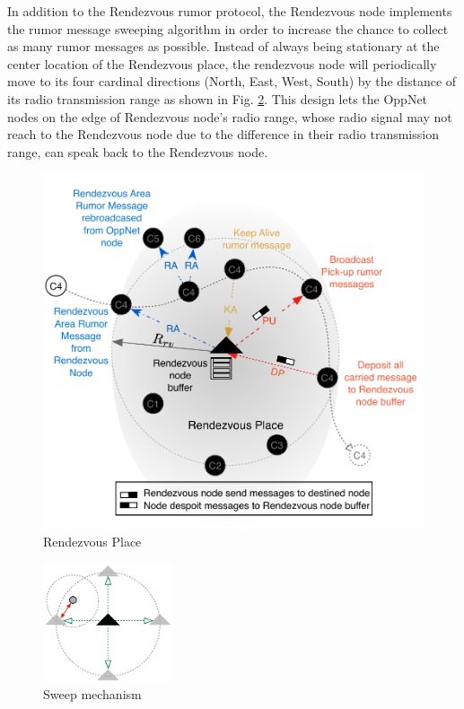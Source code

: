 In addition to the Rendezvous rumor protocol, the Rendezvous node implements the rumor message sweeping algorithm in order to increase the chance to collect as many rumor messages as possible.
%
Instead of always being stationary at the center location of the Rendezvous place, the rendezvous node will periodically move to its four cardinal directions (North, East, West, South) by the distance of its radio transmission range as shown in Fig. \ref{Sweep mechanism}.
%
This design lets the OppNet nodes on the edge of Rendezvous node's radio range, whose radio signal may not reach to the Rendezvous node due to the difference in their radio transmission range, can speak back to the Rendezvous node.

\begin{figure}[!t]
	\centering
	\includegraphics[width=5in]{Figures/NewRendezvousPlace.pdf}
	\caption{Rendezvous Place}
	\label{Rendezvous Place}
\end{figure}


\begin{figure}[!t]
\centering
\includegraphics[width=1.5in]{Figures/Sweep.pdf}
\caption{Sweep mechanism}
\label{Sweep mechanism}
\end{figure}

